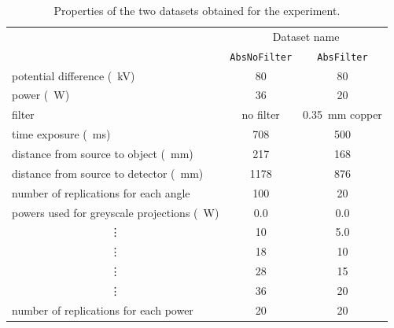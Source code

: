 \begin{table}
\centering
\begin{tabular}{l|cc}
                                                       & \multicolumn{2}{c}{Dataset name}                      \\
                                                       & \texttt{AbsNoFilter} & \texttt{AbsFilter}             \\ \hline
potential difference (\SI{}{\kilo\volt})               & 80                   & 80                             \\
power (\SI{}{\watt})                                   & 36                   & 20                             \\
filter                                                 & no filter            & \SI{0.35}{\milli\metre} copper \\
time exposure (\SI{}{\milli\second})                   & 708                  & 500                            \\
distance from source to object (\SI{}{\milli\metre})   & 217                  & 168                            \\
distance from source to detector (\SI{}{\milli\metre}) & 1178                 & 876                            \\
number of replications for each angle                  & 100                  & 20                             \\ \hline
powers used for greyscale projections (\SI{}{\watt})   & 0.0                  & 0.0                            \\
\multicolumn{1}{c|}{\vdots}                            & 10                   & 5.0                            \\
\multicolumn{1}{c|}{\vdots}                            & 18                   & 10                             \\
\multicolumn{1}{c|}{\vdots}                            & 28                   & 15                             \\
\multicolumn{1}{c|}{\vdots}                            & 36                   & 20                             \\
number of replications for each power                  & 20                   & 20                             
\end{tabular}
\caption{Properties of the two datasets obtained for the experiment.}
\label{table:data_dataset}
\end{table}


